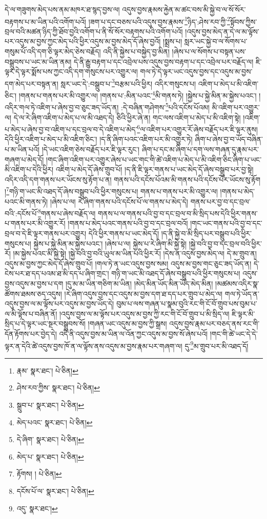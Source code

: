 དེ་ལ་གཟུགས་མེད་པས་ནམ་མཁར་ཐ་སྙད་བྱས་ལ། འདུས་བྱས་རྣམས་རྐྱེན་མ་ཚང་བས་མི་སྐྱེ་བ་ལ་སོ་སོར་བརྟགས་པ་མ་ཡིན་པའི་འགོག་པའོ། །ཟག་པ་དང་བཅས་པའི་འདུས་བྱས་རྣམས་\footnote{རྣམ་  སྣར་ཐང་།  པེ་ཅིན། }ཉིད་:ཤེས་རབ་ཀྱི་\footnote{ཤེས་རབ་ཀྱིས་  སྣར་ཐང་།  པེ་ཅིན། }སྟོབས་ཀྱིས་བྲལ་བའི་མཚན་ཉིད་ཀྱི་ཐོབ་བྱའི་འགོག་པ་ནི་སོ་སོར་བརྟགས་པའི་འགོག་པའོ། །འདུས་བྱས་མེད་ན་དེ་ལ་མ་ལྟོས་པར་འདུས་མ་བྱས་ཀྱང་མེད་པའི་ཕྱིར་འདུས་མ་བྱས་མེད་དོ་ཞེས་བྱའོ། །སྨྲས་པ། སླར་ཡང་སྐྱེ་བ་ལ་སོགས་པ་གསུམ་པོ་འདི་དག་ཅི་ལྟར་མེད་ཅེས་བརྗོད། འདི་ནི་སྐྱེས་པ་བསྐྱེད་བྱ་མིན། །ཞེས་པ་ལ་སོགས་པ་བསྟན་པས་བསྒྲུབས་པ་ཡང་མ་ཡིན་ནམ། དེ་ནི་རྒྱུ་བརྟག་པ་དང་འབྲེལ་པས་འདུས་བྱས་བརྟག་པ་དང་འབྲེལ་པར་བརྗོད་ལ། ཇི་ལྟར་དེ་ལྟར་སྨོས་པས་ཀྱང་འདི་དག་གསུངས་པར་འགྱུར་ལ། གལ་ཏེ་དེ་ལྟར་ཡང་འདུས་བྱས་དང་འདུས་མ་བྱས་དག་མེད་པར་བསྟན་ན། སླར་ཡང་དེ་:བསྒྲུབ་པ་\footnote{སྒྲུབ་པ་  སྣར་ཐང་།  པེ་ཅིན། }བརྩམ་པའི་ཕྱིར། འདིར་གསུངས་པ། འཇིག་པ་མེད་པ་མི་འཇིག་ཅིང་། །གནས་པ་གནས་པར་མི་འགྱུར་ལ། །གནས་པ་:མིན་པའང་\footnote{མེད་པའང་  སྣར་ཐང་།  པེ་ཅིན། }མི་གནས་ཏེ། །སྐྱེས་པ་སྐྱེ་མིན་མ་སྐྱེས་པའང་། །འདིར་གལ་ཏེ་འཇིག་པ་ཞེས་བྱ་བ་ཅུང་ཟད་ཡོད་ན། :དེ་བཞིན་གཤེགས་\footnote{དེ་ཞིག་  སྣར་ཐང་།  པེ་ཅིན། }པའི་དངོས་པོའམ། མི་འཇིག་པར་འགྱུར་ལ། དེ་ལ་རེ་ཞིག་འཇིག་པ་མེད་པ་ལ་མི་འཐད་དེ། ཅིའི་ཕྱིར་ཞེ་ན། གང་ལས་འཇིག་པ་མེད་པ་མི་འཇིག་སྟེ། །འཇིག་པ་མེད་པ་ཞེས་བྱ་བ་འཇིག་པ་དང་བྲལ་བ་དེ་འཇིག་པ་མེད་\footnote{མེད་པ་  སྣར་ཐང་།  པེ་ཅིན། }ལ་འཇིག་པར་འགྱུར་རོ་ཞེས་བརྗོད་པར་ཇི་ལྟར་ནུས། དེའི་ཕྱིར་འཇིག་པ་མེད་པ་མི་འཇིག་ཅིང་། །ད་ནི་ཞིག་པའང་འཇིག་པར་མི་འགྱུར་ཏེ། ཞིག་པ་ཞེས་བྱ་བ་ཡོད་བཞིན་པ་མ་ཡིན་པའོ། །དེ་ཡང་འཇིག་ཅེས་བརྗོད་པར་ཇི་ལྟར་རུང་། ཞིག་པ་དང་མ་ཞིག་པ་དག་ལས་གཞན་དུ་རྣམ་པར་གཞག་པ་མེད་དོ། །གང་ཞིག་འཇིག་པར་འགྱུར་ཞེས་པ་ཡང་གང་གི་ཚེ་འཇིག་པ་མེད་པ་མི་འཇིག་ཅིང་ཞིག་པ་ཡང་མི་འཇིག་པ་དེའི་ཕྱིར། འཇིག་པ་མེད་དོ་ཞེས་གྲུབ་པོ། །ད་ནི་ཇི་ལྟར་གནས་པ་ཡང་མེད་དོ་ཞེས་བསྒྲུབ་པར་བྱ་སྟེ། འདིར་འདི་དག་གནས་པར་ཡོངས་སུ་རྟོག་པ་ན། གནས་པའི་དངོས་པོའམ་མི་གནས་པའི་དངོས་པོར་ཡོངས་སུ་རྟོག །\footnote{རྟོགས། །  པེ་ཅིན། }གཉི་ག་ཡང་མི་འཐད་དོ་ཞེས་བསྒྲུབ་པའི་ཕྱིར་གསུངས་པ། གནས་པ་གནས་པར་མི་འགྱུར་ལ། །གནས་པ་མེད་པའང་མི་གནས་ཏེ། །ཞེས་པ་ལ། རེ་ཞིག་གནས་པའི་དངོས་པོ་ལ་གནས་པ་མེད་དེ། གནས་པར་བྱ་བ་དང་བྲལ་བའི་:དངོས་པོ་\footnote{དངོས་པོ་ལ་  སྣར་ཐང་།  པེ་ཅིན། }གནས་པ་ཞེས་བརྗོད་ལ། གནས་པ་ལ་གནས་པའི་བྱ་བ་དང་བྲལ་བ་མི་སྲིད་པས་དེའི་ཕྱིར་གནས་པ་གནས་པར་མི་འགྱུར་རོ། །གནས་པ་མེད་པའང་གནས་པའི་བྱ་བ་དང་བྲལ་བའོ། །གང་ཡང་གནས་པའི་བྱ་བ་དང་བྲལ་བ་དེ་ཇི་ལྟར་གནས་པར་འགྱུར། དེའི་ཕྱིར་གནས་པ་ཡང་མེད་དོ། །ད་ནི་སྐྱེ་བ་མི་སྲིད་པར་བསྒྲུབ་པའི་ཕྱིར་གསུངས་པ། སྐྱེས་པ་སྐྱེ་མིན་མ་སྐྱེས་པའང་། །ཞེས་པ་ལ། སྐྱེས་པ་རེ་ཞིག་མི་སྐྱེ་སྟེ། །སྐྱེ་བའི་བྱ་བ་དང་བྲལ་བའི་ཕྱིར་རོ། །མ་སྐྱེས་པའང་མི་སྐྱེ་སྟེ། །སྐྱེ་བའི་བྱ་བའི་ཡུལ་མ་ཡིན་པའི་ཕྱིར་རོ། །དེས་ན་འདུས་བྱས་མེད་ལ། དེ་མ་གྲུབ་ན། འདུས་མ་བྱས་ཀྱང་མེད་དོ་ཞེས་གྲུབ་པོ། །གལ་ཏེ་ན་ཡང་འདུས་བྱས་སམ། འདུས་མ་བྱས་གང་ཅུང་ཟད་ཡོད་ན། དེ་ངེས་པར་ཐ་དད་པའམ་ཐ་མི་དད་པ་ཞིག་གྲང་། གཉི་ག་ཡང་མི་འཐད་དོ་ཞེས་བསྒྲུབ་པའི་ཕྱིར་གསུངས་པ། འདུས་བྱས་འདུས་མ་བྱས་པ་དག །དུ་མ་མ་ཡིན་གཅིག་མ་ཡིན། །མེད་མིན་ཡོད་མིན་ཡོད་མེད་མིན། །མཚམས་འདིར་སྣ་ཚོགས་ཐམས་ཅད་འདུས། །རེ་ཞིག་འདུས་བྱས་དང་འདུས་མ་བྱས་དག་ཐ་དད་པར་གྲུབ་པ་མེད་ལ། གལ་ཏེ་ཡོད་ན་འདུས་བྱས་ལ་མ་ལྟོས་པར་འདུས་མ་བྱས་ཡོད་དེ། བུམ་པ་ལས་གཞན་པ་སྣམ་བུའི་རང་གི་ངོ་བོ་གྲུབ་པས་བུམ་པ་ལ་མི་ལྟོས་པ་བཞིན་ནོ། །འདུས་བྱས་ལ་མ་ལྟོས་པར་འདུས་མ་བྱས་ཀྱི་རང་གི་ངོ་བོ་གྲུབ་པ་མི་སྲིད་ལ། ཇི་ལྟར་མི་སྲིད་པ་དེ་ལྟར་ཡང་སྔར་བསྒྲུབས་སོ། །གཞན་ཡང་འདུས་མ་བྱས་ཀྱི་སྒྲས། འདུས་བྱས་རྣམ་པར་བཅད་ནས་རང་གི་དོན་རྟོགས་པར་བྱེད་དེ། འདི་ནི་འདུས་བྱས་མ་ཡིན་ལ་འོན་ཀྱང་འདུས་མ་བྱས་སོ་ཞེས་པའོ། །གང་གི་ཚེ་ཡང་དེ་དེ་ལྟར་ན་དེའི་ཚེ་འདུས་བྱས་ཁོ་ན་ལ་ལྟོས་ནས་འདུས་མ་བྱས་རྣམ་པར་གཞག་ལ། དུ་\footnote{འདུ་  སྣར་ཐང་། }མ་གྲུབ་པར་མི་འཐད་དོ། 